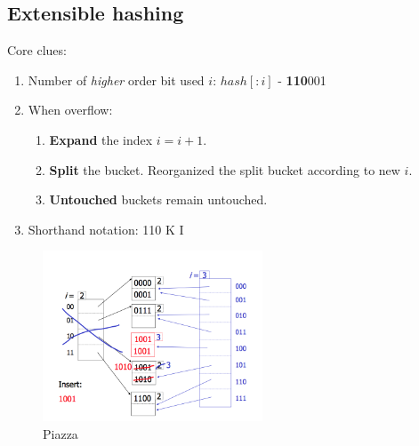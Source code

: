 \documentclass[a4paper]{report}
\begin{document}
\subsection{Extensible hashing}
Core clues:
\begin{enumerate}
\item Number of \textit{higher} order bit used $i$: $hash[:i]$ - \textbf{110}001
\item When overflow:
  \begin{enumerate}
  \item \textbf{Expand} the index $i=i+1$.
  \item \textbf{Split} the bucket. Reorganized the split bucket according to new $i$.
  \item \textbf{Untouched} buckets remain untouched. 
  \end{enumerate}
\item Shorthand notation: 110  K I
\end{enumerate}
\begin{figure}[H]
        \centerline{\includegraphics[height = 2in]{img/extensible_hashing}}
        \caption{Piazza}
    \label{fig:extensibleHashing}
\end{figure}
\end{document}
